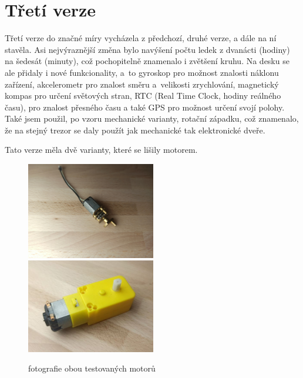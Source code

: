 \section{Třetí verze}


Třetí verze do značné míry vycházela z předchozí, druhé verze, a dále na ní stavěla. Asi nejvýraznější změna bylo navýšení počtu 
ledek z dvanácti (hodiny) na šedesát (minuty), což pochopitelně znamenalo i zvětšení kruhu. Na desku se ale přidaly i nové funkcionality,
a~to gyroskop pro možnost znalosti náklonu zařízení, akcelerometr pro znalost směru a~velikosti zrychlování, magnetický kompas pro určení světových
stran, RTC (Real Time Clock, hodiny reálného času), pro znalost přesného času a také GPS pro možnost určení svojí polohy.
Také jsem použil, po vzoru mechanické varianty, rotační západku, což znamenalo, že na stejný trezor se daly použít jak mechanické tak 
elektronické dveře.

Tato verze měla dvě varianty, které se lišily motorem.
\begin{figure}[htbp]
    \centering
    \includegraphics[width=160pt]{kapitoly/obrazky/E3/motory/hodinovyStrojek.jpg}
    \includegraphics[width=160pt]{kapitoly/obrazky/E3/motory/zluty_motor.jpg}
    \caption{fotografie obou testovaných motorů} 
    \label{fig:E3-motory}
\end{figure}

